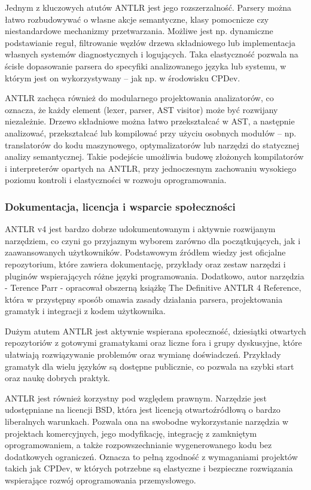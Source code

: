 \documentclass[12pt,twoside]{article}
\begin{document}
Jednym z kluczowych atutów ANTLR jest jego rozszerzalność. Parsery można łatwo rozbudowywać o własne akcje semantyczne, klasy pomocnicze czy niestandardowe mechanizmy przetwarzania. Możliwe jest np. dynamiczne podstawianie reguł, filtrowanie węzłów drzewa składniowego lub implementacja własnych systemów diagnostycznych i logujących. Taka elastyczność pozwala na ścisłe dopasowanie parsera do specyfiki analizowanego języka lub systemu, w którym jest on wykorzystywany – jak np. w środowisku CPDev.

ANTLR zachęca również do modularnego projektowania analizatorów, co oznacza, że każdy element (lexer, parser, AST visitor) może być rozwijany niezależnie. Drzewo składniowe można łatwo przekształcać w AST, a następnie analizować, przekształcać lub kompilować przy użyciu osobnych modułów – np. translatorów do kodu maszynowego, optymalizatorów lub narzędzi do statycznej analizy semantycznej. Takie podejście umożliwia budowę złożonych kompilatorów i interpreterów opartych na ANTLR, przy jednoczesnym zachowaniu wysokiego poziomu kontroli i elastyczności w rozwoju oprogramowania.

\subsubsection{Dokumentacja, licencja i wsparcie społeczności}
ANTLR v4 jest bardzo dobrze udokumentowanym i aktywnie rozwijanym narzędziem, co czyni go przyjaznym wyborem zarówno dla początkujących, jak i zaawansowanych użytkowników. Podstawowym źródłem wiedzy jest oficjalne repozytorium, które zawiera dokumentację, przykłady oraz zestaw narzędzi i pluginów wspierających różne języki programowania. Dodatkowo, autor narzędzia - Terence Parr - opracował obszerną książkę The Definitive ANTLR 4 Reference, która w przystępny sposób omawia zasady działania parsera, projektowania gramatyk i integracji z kodem użytkownika.

Dużym atutem ANTLR jest aktywnie wspierana społeczność, dziesiątki otwartych repozytoriów z gotowymi gramatykami oraz liczne fora i grupy dyskusyjne, które ułatwiają rozwiązywanie problemów oraz wymianę doświadczeń. Przykłady gramatyk dla wielu języków są dostępne publicznie, co pozwala na szybki start oraz naukę dobrych praktyk.

ANTLR jest również korzystny pod względem prawnym. Narzędzie jest udostępniane na licencji BSD, która jest licencją otwartoźródłową o bardzo liberalnych warunkach. Pozwala ona na swobodne wykorzystanie narzędzia w projektach komercyjnych, jego modyfikację, integrację z zamkniętym oprogramowaniem, a także rozpowszechnianie wygenerowanego kodu bez dodatkowych ograniczeń. Oznacza to pełną zgodność z wymaganiami projektów takich jak CPDev, w których potrzebne są elastyczne i bezpieczne rozwiązania wspierające rozwój oprogramowania przemysłowego.
\end{document}
